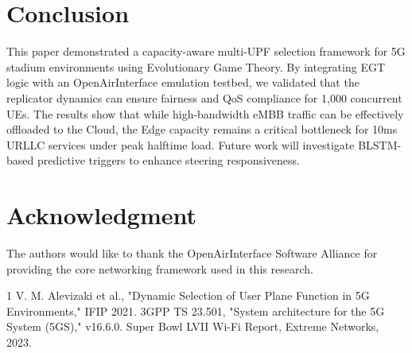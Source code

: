 \documentclass[conference]{IEEEtran}
\begin{document}
\section{Conclusion}
This paper demonstrated a capacity-aware multi-UPF selection framework for 5G stadium environments using Evolutionary Game Theory. By integrating EGT logic with an OpenAirInterface emulation testbed, we validated that the replicator dynamics can ensure fairness and QoS compliance for 1,000 concurrent UEs. The results show that while high-bandwidth eMBB traffic can be effectively offloaded to the Cloud, the Edge capacity remains a critical bottleneck for 10ms URLLC services under peak halftime load. Future work will investigate BLSTM-based predictive triggers to enhance steering responsiveness.

\section*{Acknowledgment}
The authors would like to thank the OpenAirInterface Software Alliance for providing the core networking framework used in this research.


\begin{thebibliography}{1}
V. M. Alevizaki et al., "Dynamic Selection of User Plane Function in 5G Environments," IFIP 2021.
3GPP TS 23.501, "System architecture for the 5G System (5GS)," v16.6.0.
Super Bowl LVII Wi-Fi Report, Extreme Networks, 2023.
\end{thebibliography}
\end{document}
